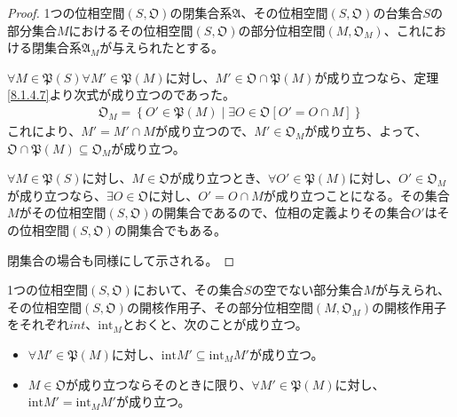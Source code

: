 \documentclass[dvipdfmx]{jsarticle}
\begin{document}
\begin{proof}
1つの位相空間$\left( S,\mathfrak{O} \right)$の閉集合系$\mathfrak{A}$、その位相空間$\left( S,\mathfrak{O} \right)$の台集合$S$の部分集合$M$におけるその位相空間$\left( S,\mathfrak{O} \right)$の部分位相空間$\left( M,\mathfrak{O}_{M} \right)$、これにおける閉集合系$\mathfrak{A}_{M}$が与えられたとする。\par
$\forall M \in \mathfrak{P}(S)\forall M'\in \mathfrak{P}(M)$に対し、$M'\in \mathfrak{O \cap P}(M)$が成り立つなら、定理\ref{8.1.4.7}より次式が成り立つのであった。
\begin{align*}
\mathfrak{O}_{M} = \left\{ O'\in \mathfrak{P}(M) \middle| \exists O \in \mathfrak{O}\left[ O' = O \cap M \right] \right\}
\end{align*}
これにより、$M' = M' \cap M$が成り立つので、$M' \in \mathfrak{O}_{M}$が成り立ち、よって、$\mathfrak{O \cap P}(M) \subseteq \mathfrak{O}_{M}$が成り立つ。\par
$\forall M \in \mathfrak{P}(S)$に対し、$M \in \mathfrak{O}$が成り立つとき、$\forall O'\in \mathfrak{P}(M)$に対し、$O' \in \mathfrak{O}_{M}$が成り立つなら、$\exists O \in \mathfrak{O}$に対し、$O' = O \cap M$が成り立つことになる。その集合$M$がその位相空間$\left( S,\mathfrak{O} \right)$の開集合であるので、位相の定義よりその集合$O'$はその位相空間$\left( S,\mathfrak{O} \right)$の開集合でもある。\par
閉集合の場合も同様にして示される。
\end{proof}
\begin{thm}\label{8.1.4.12}
1つの位相空間$\left( S,\mathfrak{O} \right)$において、その集合$S$の空でない部分集合$M$が与えられ、その位相空間$\left( S,\mathfrak{O} \right)$の開核作用子、その部分位相空間$\left( M,\mathfrak{O}_{M} \right)$の開核作用子をそれぞれ$int$、${\mathrm{int}}_{M}$とおくと、次のことが成り立つ。
\begin{itemize}
\item
  $\forall M'\in \mathfrak{P}(M)$に対し、${\mathrm{int}}M' \subseteq {\mathrm{int}}_{M}M'$が成り立つ。
\item
  $M \in \mathfrak{O}$が成り立つならそのときに限り、$\forall M'\in \mathfrak{P}(M)$に対し、${\mathrm{int}}M' = {\mathrm{int}}_{M}M'$が成り立つ。
\end{itemize}
\end{thm}
\end{document}
